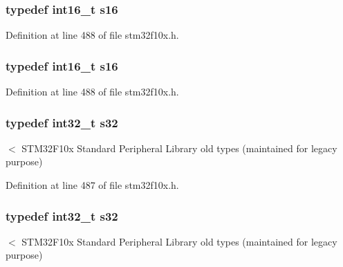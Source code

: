 \subsubsection[{\texorpdfstring{s16}{s16}}]{\setlength{\rightskip}{0pt plus 5cm}typedef {\bf int16\+\_\+t} {\bf s16}}\hypertarget{group___exported__types_gaa980e2c02ba2305e0f489d5650655425}{}\label{group___exported__types_gaa980e2c02ba2305e0f489d5650655425}


Definition at line 488 of file stm32f10x.\+h.

\subsubsection[{\texorpdfstring{s16}{s16}}]{\setlength{\rightskip}{0pt plus 5cm}typedef {\bf int16\+\_\+t} {\bf s16}}\hypertarget{group___exported__types_gaa980e2c02ba2305e0f489d5650655425}{}\label{group___exported__types_gaa980e2c02ba2305e0f489d5650655425}


Definition at line 488 of file stm32f10x.\+h.

\subsubsection[{\texorpdfstring{s32}{s32}}]{\setlength{\rightskip}{0pt plus 5cm}typedef {\bf int32\+\_\+t} {\bf s32}}\hypertarget{group___exported__types_gae9b1af5c037e57a98884758875d3a7c4}{}\label{group___exported__types_gae9b1af5c037e57a98884758875d3a7c4}
$<$ S\+T\+M32\+F10x Standard Peripheral Library old types (maintained for legacy purpose) 

Definition at line 487 of file stm32f10x.\+h.

\subsubsection[{\texorpdfstring{s32}{s32}}]{\setlength{\rightskip}{0pt plus 5cm}typedef {\bf int32\+\_\+t} {\bf s32}}\hypertarget{group___exported__types_gae9b1af5c037e57a98884758875d3a7c4}{}\label{group___exported__types_gae9b1af5c037e57a98884758875d3a7c4}
$<$ S\+T\+M32\+F10x Standard Peripheral Library old types (maintained for legacy purpose) 

